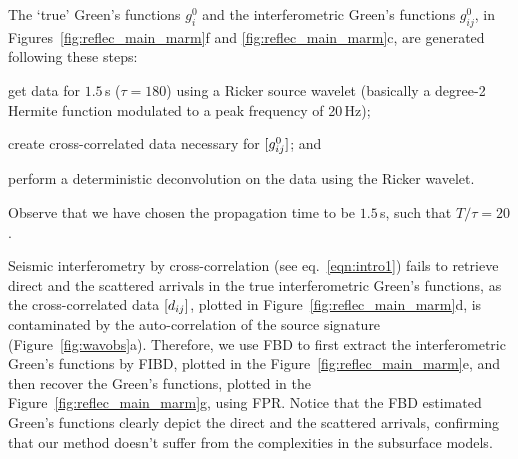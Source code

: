 %
The `true' Green's functions $g^0_{i}$ and the  
interferometric Green's functions $g^0_{ij}$,
in Figures~\ref{fig:reflec_main_marm}f and \ref{fig:reflec_main_marm}c,
are generated following these steps: 
\begin{inparaenum}
\item get data for $1.5\,$s ($\tau=180$) using a Ricker source wavelet (basically a degree-2 Hermite function modulated to a 
	peak frequency of 20$\,$Hz);
\item create cross-correlated data necessary for $[g^0_{ij}]$; {and}
\item perform a deterministic deconvolution on the data 
	using the Ricker wavelet.
\end{inparaenum}
%
Observe that we have chosen
the 
propagation time to be 
$1.5\,$s, such that $T/\tau=20$.

Seismic interferometry by cross-correlation (see eq.~\ref{eqn:intro1})
fails to retrieve 
direct and the scattered arrivals in the 
true interferometric
Green's functions,
as the  
cross-correlated data $[d_{ij}]$, plotted in Figure~\ref{fig:reflec_main_marm}d,
is contaminated by the 
auto-correlation of the source signature (Figure~\ref{fig:wavobs}a).
%
Therefore, 
we use FBD to first extract the interferometric Green's functions by FIBD, plotted in 
the Figure~\ref{fig:reflec_main_marm}e, and then recover the 
Green's functions, plotted in the Figure~\ref{fig:reflec_main_marm}g, using FPR.
%
Notice that the FBD estimated Green's functions 
clearly depict 
the direct and the scattered arrivals, confirming that 
our method
doesn't suffer from the complexities in the subsurface models.




